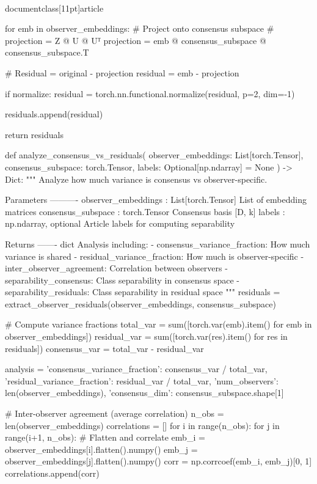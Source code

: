 \\documentclass[11pt]{article}
\begin{document}
\begin{CodeBlock}
    for emb in observer_embeddings:
        # Project onto consensus subspace
        # projection = Z @ U @ Uᵀ
        projection = emb @ consensus_subspace @ consensus_subspace.T
        
        # Residual = original - projection
        residual = emb - projection
        
        if normalize:
            residual = torch.nn.functional.normalize(residual, p=2, dim=-1)
        
        residuals.append(residual)
    
    return residuals


def analyze_consensus_vs_residuals(
    observer_embeddings: List[torch.Tensor],
    consensus_subspace: torch.Tensor,
    labels: Optional[np.ndarray] = None
) -> Dict:
    """
    Analyze how much variance is consensus vs observer-specific.
    
    Parameters
    ----------
    observer_embeddings : List[torch.Tensor]
        List of embedding matrices
    consensus_subspace : torch.Tensor
        Consensus basis [D, k]
    labels : np.ndarray, optional
        Article labels for computing separability
    
    Returns
    -------
    dict
        Analysis including:
        - consensus_variance_fraction: How much variance is shared
        - residual_variance_fraction: How much is observer-specific
        - inter_observer_agreement: Correlation between observers
        - separability_consensus: Class separability in consensus space
        - separability_residuals: Class separability in residual space
    """
    residuals = extract_observer_residuals(observer_embeddings, consensus_subspace)
    
    # Compute variance fractions
    total_var = sum([torch.var(emb).item() for emb in observer_embeddings])
    residual_var = sum([torch.var(res).item() for res in residuals])
    consensus_var = total_var - residual_var
    
    analysis = {
        'consensus_variance_fraction': consensus_var / total_var,
        'residual_variance_fraction': residual_var / total_var,
        'num_observers': len(observer_embeddings),
        'consensus_dim': consensus_subspace.shape[1]
    }
    
    # Inter-observer agreement (average correlation)
    n_obs = len(observer_embeddings)
    correlations = []
    for i in range(n_obs):
        for j in range(i+1, n_obs):
            # Flatten and correlate
            emb_i = observer_embeddings[i].flatten().numpy()
            emb_j = observer_embeddings[j].flatten().numpy()
            corr = np.corrcoef(emb_i, emb_j)[0, 1]
            correlations.append(corr)
    

\end{CodeBlock}
\end{document}
